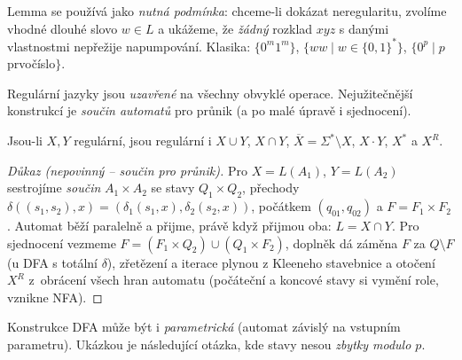 \documentclass[11pt,a4paper]{article}
\begin{document}
\begin{intuice}
Lemma se používá jako \emph{nutná podmínka}: chceme-li dokázat neregularitu, zvolíme vhodné dlouhé slovo $w\in L$ a ukážeme, že \emph{žádný} rozklad $xyz$ s danými vlastnostmi nepřežije napumpování. Klasika: $\{0^m1^m\}$, $\{ww\mid w\in\{0,1\}^*\}$, $\{0^p\mid p$ prvočíslo$\}$.
\end{intuice}

Regulární jazyky jsou \emph{uzavřené} na všechny obvyklé operace. Nejužitečnější konstrukcí je \emph{součin automatů} pro průnik (a po malé úpravě i sjednocení).

\begin{veta}
Jsou-li $X,Y$ regulární, jsou regulární i $X\cup Y$, $X\cap Y$, $\overline X=\Sigma^*\setminus X$, $X\cdot Y$, $X^*$ a $X^R$.
\end{veta}

\begin{proof}[Důkaz \textnormal{(nepovinný -- součin pro průnik)}]
Pro $X=L(A_1)$, $Y=L(A_2)$ sestrojíme \emph{součin} $A_1\times A_2$ se stavy $Q_1\times Q_2$, přechody $\delta((s_1,s_2),x)=(\delta_1(s_1,x),\delta_2(s_2,x))$, počátkem $(q_{01},q_{02})$ a $F=F_1\times F_2$. Automat běží paralelně a přijme, právě když přijmou oba: $L=X\cap Y$. Pro sjednocení vezmeme $F=(F_1\times Q_2)\cup(Q_1\times F_2)$, doplněk dá záměna $F$ za $Q\setminus F$ (u DFA s totální $\delta$), zřetězení a iterace plynou z Kleeneho stavebnice a otočení $X^R$ z~obrácení všech hran automatu (počáteční a koncové stavy si vymění role, vznikne NFA).
\end{proof}

Konstrukce DFA může být i \emph{parametrická} (automat závislý na vstupním parametru). Ukázkou je následující otázka, kde stavy nesou \emph{zbytky modulo $p$}.
\end{document}
